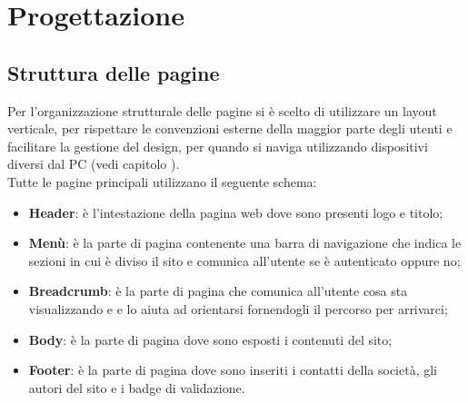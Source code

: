 \section{Progettazione}
    \subsection{Struttura delle pagine}
    Per l'organizzazione strutturale delle pagine si è scelto di utilizzare un layout verticale, per rispettare le convenzioni esterne della maggior parte degli utenti e facilitare la gestione del design, per quando si naviga utilizzando dispositivi diversi dal PC (vedi capitolo ).\\
    Tutte le pagine principali utilizzano il seguente schema:
    \begin{itemize}
        \item \textbf{Header}: è l'intestazione della pagina web dove sono presenti logo e titolo;
        \item \textbf{Menù}: è la parte di pagina contenente una barra di navigazione che indica le sezioni in cui è diviso il sito e comunica all'utente se è autenticato oppure no;
        \item \textbf{Breadcrumb}: è la parte di pagina che comunica all'utente cosa sta visualizzando e e lo aiuta ad orientarsi fornendogli il percorso per arrivarci;
        \item \textbf{Body}: è la parte di pagina dove sono esposti i contenuti del sito;
        \item \textbf{Footer}: è la parte di pagina dove sono inseriti i contatti della società, gli autori del sito e i badge di validazione.
    \end{itemize}
    
